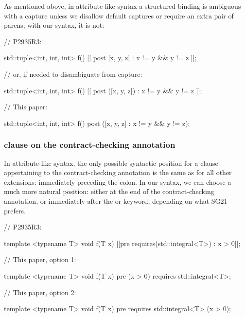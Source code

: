 As mentioned above, in attribute-like syntax a structured binding is ambiguous with a capture unless we disallow default captures or require an extra pair of parens; with our syntax, it is not:

\begin{minipage}[t]{8cm}
\begin{codeblock}
// P2935R3:

std::tuple<int, int, int> f()
  [[ post [x, y, z] : x != y && y != z ]];
  
// or, if needed to disambiguate from capture:

std::tuple<int, int, int> f()
  [[ post ([x, y, z]) : x != y && y != z ]];
\end{codeblock}
\end{minipage}
\begin{minipage}[t]{8cm}
\begin{codeblock}
// This paper:

std::tuple<int, int, int> f()
  post ([x, y, z] : x != y && y != z);
\end{codeblock}
\end{minipage}

\subsubsection{ clause on the contract-checking annotation}

In attribute-like syntax, the only possible syntactic position for a   clause appertaining to the contract-checking annotation is the same as for all other extensions: immediately preceding the colon. In our syntax, we can choose a much more natural position: either at the end of the contract-checking annotation, or immediately after the  or  keyword, depending on what SG21 prefers.


\begin{minipage}[t]{8.7cm}
\begin{codeblock}
// P2935R3:

template <typename T>
void f(T x)
  [[pre requires(std::integral<T>) : x > 0]];
\end{codeblock}
\end{minipage}
\begin{minipage}[t]{8cm}
\begin{codeblock}
// This paper, option 1:

template <typename T>
void f(T x)
  pre (x > 0) requires std::integral<T>;
    
// This paper, option 2:

template <typename T>
void f(T x)
  pre requires std::integral<T> (x > 0);
\end{codeblock}
\end{minipage}

